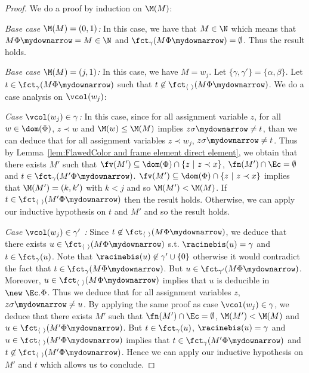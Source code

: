 \begin{proof}
We do a proof by induction on $\M(M)$:

\medskip

\noindent\emph{Base case $\M(M) = (0, 1)$:} In this case, we have that $M \in \N$ which means that $M\Phi\mydownarrow = M \in \N$ and $\fct_\gamma(M\Phi\mydownarrow) = \emptyset$. Thus the result holds. 

\medskip

\noindent\emph{Base case $\M(M) = (j,1)$:} In this case, we have $M = w_j$. Let $\{\gamma,\gamma'\} = \{\alpha,\beta\}$. Let $t \in \fct_\gamma(M\Phi\mydownarrow)$ such that $t \not\in \fctpair(M\Phi\mydownarrow)$. We do a case analysis on $\vcol(w_j)$:

\emph{Case $\vcol(w_j) \in \gamma$:} In this case, since for all assignment variable $z$, for all $w \in \dom(\Phi)$, $z \prec w$ and $\M(w) \leq \M(M)$ implies $z\sigma\mydownarrow \neq t$, than we can deduce that for all assignment variables $z \prec w_j$, $z\sigma\mydownarrow \neq t$. Thus by Lemma~\ref{lem:FlawedColor and frame element direct element}, we obtain that there exists $M'$ such that $\fv(M') \subseteq \dom(\Phi) \cap \{z ~|~ z \prec x\}$, $\fn(M') \cap \Ec = \emptyset$ and $t \in \fct_\gamma(M'\Phi\mydownarrow)$. $\fv(M') \subseteq \dom(\Phi) \cap \{z ~|~ z \prec x\}$ implies that $\M(M') = (k,k')$ with $k < j$ and so $\M(M') < \M(M)$. If $t \in \fctpair(M'\Phi\mydownarrow)$ then the result holds. Otherwise, we can apply our inductive hypothesis on $t$ and $M'$ and so the result holds.
 
 \emph{Case $\vcol(w_j) \in \gamma'$ :} Since $t \not\in \fctpair(M\Phi\mydownarrow)$, we deduce that there exists $u \in \fctpair(M\Phi\mydownarrow)$ s.t. $\racinebis(u) = \gamma$ and $t \in \fct_\gamma(u)$. Note that $\racinebis(u) \not\in \gamma' \cup \{0\}$ otherwise it would contradict the fact that $t \in \fct_\gamma(M\Phi\mydownarrow)$. But $u \in \fct_{\gamma'}(M\Phi\mydownarrow)$. Moreover, $u \in \fctpair(M\Phi\mydownarrow)$ implies that $u$ is deducible in $\new\ \Ec. \Phi$. Thus we deduce that for all assignment variables $z$, $z\sigma\mydownarrow \neq u$. By applying the same proof as case $\vcol(w_j) \in \gamma$, we deduce that there exists $M'$ such that $\fn(M') \cap \Ec = \emptyset$, $\M(M') < \M(M)$ and $u \in \fctpair(M'\Phi\mydownarrow)$. But $t \in \fct_\gamma(u)$, $\racinebis(u) = \gamma$ and $u \in \fctpair(M'\Phi\mydownarrow)$ implies that $t \in \fct_\gamma(M'\Phi\mydownarrow)$ and $t \not\in \fctpair(M'\Phi\mydownarrow)$. Hence we can apply our inductive hypothesis on $M'$ and $t$ which allows us to conclude.


\end{proof}

